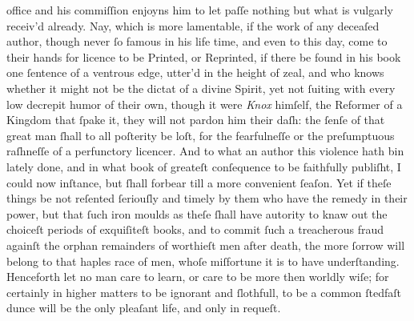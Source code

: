 office and his commiſſion enjoyns him to let paſſe nothing but what is vulgarly
receiv'd already.  Nay, which is more lamentable, if the work of any deceaſed
author, though never ſo famous in his life time, and even to this day, come to
their hands for licence to be Printed, or Reprinted, if there be found in his
book one ſentence of a ventrous edge, utter'd in the height of zeal, and who
knows whether it might not be the dictat of a divine Spirit, yet not ſuiting
with every low decrepit humor of their own, though it were \textit{Knox}
himſelf, the Reformer of a Kingdom that ſpake it, they will not pardon him their
daſh: the ſenſe of that great man ſhall to all poſterity be loſt, for the
fearfulneſſe or the preſumptuous raſhneſſe of a perfunctory licencer.  And to
what an author this violence hath bin lately done, and in what book of greateſt
conſequence to be faithfully publiſht, I could now inſtance, but ſhall forbear
till a more convenient ſeaſon.  Yet if theſe things be not reſented ſeriouſly
and timely by them who have the remedy in their power, but that ſuch iron moulds
as theſe ſhall have autority to knaw out the choiceſt periods of exquiſiteſt
books, and to commit ſuch a treacherous fraud againſt the orphan remainders of
worthieſt men after death, the more ſorrow will belong to that haples race of
men, whoſe miſfortune it is to have underſtanding.  Henceforth let no man care
to learn, or care to be more then worldly wiſe; for certainly in higher matters
to be ignorant and ſlothfull, to be a common ſtedfaſt dunce will be the only
pleaſant life, and only in requeſt.

